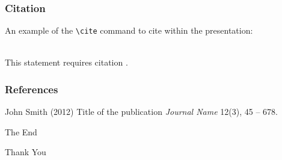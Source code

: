 \documentclass{beamer}
\begin{document}
\begin{frame}[fragile] %
\frametitle{Citation}
An example of the \verb|\cite| command to cite within the presentation:\\~

This statement requires citation \cite{p1}.
\end{frame}


\begin{frame}
\frametitle{References}
\footnotesize{
\begin{thebibliography}{99} %
 John Smith (2012)
\newblock Title of the publication
\newblock \emph{Journal Name} 12(3), 45 -- 678.
\end{thebibliography}
}
\end{frame}


\begin{frame}
\Huge{\centerline{The End}}
\medskip
\Huge{\centerline{Thank You}}
\end{frame}

\end{document}
